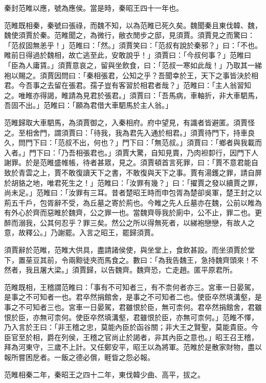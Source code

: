 \begin{pinyinscope}
秦封范睢以應，號為應侯。當是時，秦昭王四十一年也。

范睢既相秦，秦號曰張祿，而魏不知，以為范睢已死久矣。魏聞秦且東伐韓、魏，魏使須賈於秦。范睢聞之，為微行，敝衣閒步之邸，見須賈。須賈見之而驚曰：「范叔固無恙乎！」范睢曰：「然。」須賈笑曰：「范叔有說於秦邪？」曰：「不也。睢前日得過於魏相，故亡逃至此，安敢說乎！」須賈曰：「今叔何事？」范睢曰「臣為人庸賃。」須賈意哀之，留與坐飲食，曰：「范叔一寒如此哉！」乃取其一綈袍以賜之。須賈因問曰：「秦相張君，公知之乎？吾聞幸於王，天下之事皆決於相君。今吾事之去留在張君。孺子豈有客習於相君者哉？」范睢曰：「主人翁習知之。唯睢亦得謁，睢請為見君於張君。」須賈曰：「吾馬病，車軸折，非大車駟馬，吾固不出。」范睢曰：「願為君借大車駟馬於主人翁。」

范睢歸取大車駟馬，為須賈御之，入秦相府。府中望見，有識者皆避匿。須賈怪之。至相舍門，謂須賈曰：「待我，我為君先入通於相君。」須賈待門下，持車良久，問門下曰：「范叔不出，何也？」門下曰：「無范叔。」須賈曰：「鄉者與我載而入者。」門下曰：「乃吾相張君也。」須賈大驚，自知見賣，乃肉袒厀行，因門下人謝罪。於是范睢盛帷帳，待者甚眾，見之。須賈頓首言死罪，曰：「賈不意君能自致於青雲之上，賈不敢復讀天下之書，不敢復與天下之事。賈有湯鑊之罪，請自屏於胡貉之地，唯君死生之！」范睢曰：「汝罪有幾？」曰：「擢賈之發以續賈之罪，尚未足。」范睢曰：「汝罪有三耳。昔者楚昭王時而申包胥為楚卻吳軍，楚王封之以荊五千戶，包胥辭不受，為丘墓之寄於荊也。今睢之先人丘墓亦在魏，公前以睢為有外心於齊而惡睢於魏齊，公之罪一也。當魏齊辱我於廁中，公不止，罪二也。更醉而溺我，公其何忍乎？罪三矣。然公之所以得無死者，以綈袍戀戀，有故人之意，故釋公。」乃謝罷。入言之昭王，罷歸須賈。

須賈辭於范睢，范睢大供具，盡請諸侯使，與坐堂上，食飲甚設。而坐須賈於堂下，置莝豆其前，令兩黥徒夾而馬食之。數曰：「為我告魏王，急持魏齊頭來！不然者，我且屠大梁。」須賈歸，以告魏齊。魏齊恐，亡走趙。匿平原君所。

范睢既相，王稽謂范睢曰：「事有不可知者三，有不柰何者亦三。宮車一日晏駕，是事之不可知者一也。君卒然捐館舍，是事之不可知者二也。使臣卒然填溝壑，是事之不可知者三也。宮車一日晏駕，君雖恨於臣，無可柰何。君卒然捐館舍，君雖恨於臣，亦無可柰何。使臣卒然填溝壑，君雖恨於臣，亦無可柰何。」范睢不懌，乃入言於王曰：「非王稽之忠，莫能內臣於函谷關；非大王之賢聖，莫能貴臣。今臣官至於相，爵在列侯，王稽之官尚止於謁者，非其內臣之意也。」昭王召王稽，拜為河東守，三歲不上計。又任鄭安平，昭王以為將軍。范睢於是散家財物，盡以報所嘗困戹者。一飯之德必償，睚眥之怨必報。

范睢相秦二年，秦昭王之四十二年，東伐韓少曲、高平，拔之。


\end{pinyinscope}
